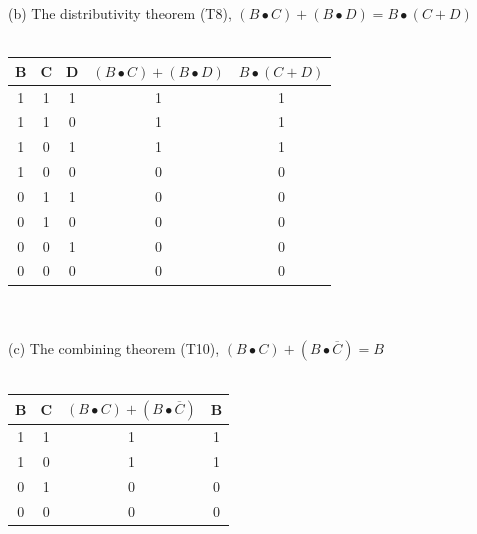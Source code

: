 \documentclass[12pt,a4paper]{report}
\newcommand*{\cl}{\overline{C}}
\begin{document}
\begin{normalsize}
(b) The distributivity theorem (T8), $ (B \bullet C) + (B \bullet D) = B \bullet (C + D) $ \\ \\
\begin{tabular}{|c|c|c|c|c|}
B & C & D & $ (B \bullet C) + (B \bullet D) $ & $ B \bullet (C + D) $ \\ 
\hline 
1 & 1 & 1 & 1 & 1 \\ 
\hline 
1 & 1 & 0 & 1 & 1 \\ 
\hline 
1 & 0 & 1 & 1 & 1 \\ 
\hline 
1 & 0 & 0 & 0 & 0 \\ 
\hline 
0 & 1 & 1 & 0 & 0 \\ 
\hline 
0 & 1 & 0 & 0 & 0 \\ 
\hline 
0 & 0 & 1 & 0 & 0 \\ 
\hline 
0 & 0 & 0 & 0 & 0 \\ 
\hline 
\end{tabular} \\ \\

(c) The combining theorem (T10), $ (B \bullet C) + (B \bullet \cl{}) = B $ \\ \\
\begin{tabular}{|c|c|c|c|}
B & C & $ (B \bullet C) + (B \bullet \cl{}) $ & B \\
\hline 
1 & 1 & 1 & 1 \\ 
\hline 
1 & 0 & 1 & 1 \\ 
\hline 
0 & 1 & 0 & 0 \\ 
\hline 
0 & 0 & 0 & 0 \\ 
\hline 
\end{tabular} \\ \\

\end{normalsize}
\end{document}
